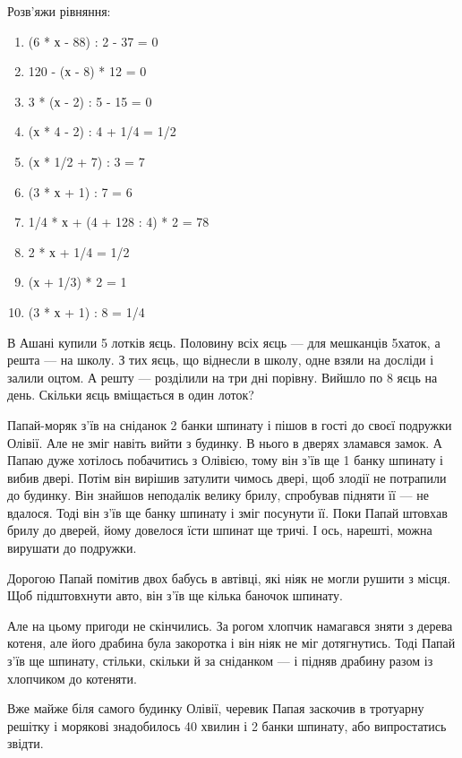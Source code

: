\problem
Розв’яжи рівняння:
\begin{multicols}{2}
    \begin{enumerate}
        \item (6 * х - 88) : 2 - 37 = 0
        \item 120 - (х - 8) * 12 = 0
        \item 3 * (х - 2) : 5 - 15 = 0
        \item (х * 4 - 2) : 4 + 1/4 = 1/2
        \item (х * 1/2 + 7) : 3 = 7
        \item (3 * х + 1) : 7 = 6
        \item 1/4 * х + (4 + 128 : 4) * 2 = 78
        \item 2 * х + 1/4 = 1/2 
        \item (х + 1/3) * 2 = 1
        \item (3 * х + 1) : 8 = 1/4
    \end{enumerate}
\end{multicols}


\problem
В Ашані купили 5 лотків яєць.
Половину всіх яєць --- для мешканців 5хаток, а решта --- на школу.
З тих яєць, що віднесли в школу, одне взяли на досліди і залили оцтом.
А решту --- розділили на три дні порівну. Вийшло по 8 яєць на день.
Скільки яєць вміщається в один лоток? 


\problem
Папай-моряк з’їв на сніданок 2 банки шпинату і пішов в гості до своєї
подружки Олівії. Але не зміг навіть вийти з будинку. В нього в дверях
зламався замок. А Папаю дуже хотілось побачитись з Олівією, тому він
з’їв ще 1 банку шпинату і вибив двері. Потім він вирішив затулити
чимось двері, щоб злодії не потрапили до будинку. Він знайшов неподалік
велику брилу, спробував підняти її --- не вдалося. Тоді він з’їв ще банку
шпинату і зміг посунути її. Поки Папай штовхав брилу до дверей, йому
довелося їсти шпинат ще тричі. І ось, нарешті, можна вирушати до подружки.

Дорогою Папай помітив двох бабусь в автівці, які ніяк не могли рушити
з місця. Щоб підштовхнути авто, він з’їв ще кілька баночок шпинату.

Але на цьому пригоди не скінчились. За рогом хлопчик намагався зняти
з дерева котеня, але його драбина була закоротка і він ніяк не міг
дотягнутись. Тоді Папай з’їв ще шпинату, стільки, скільки й
за сніданком --- і підняв драбину разом із хлопчиком до котеняти.

Вже майже біля самого будинку Олівії, черевик Папая заскочив в тротуарну
решітку і морякові знадобилось 40 хвилин і 2 банки шпинату,
або випростатись звідти.

